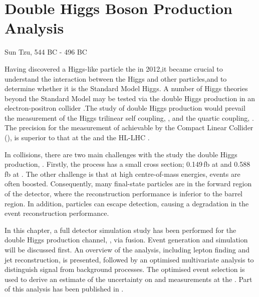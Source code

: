 \chapter{Double Higgs Boson Production Analysis}
\label{chap:DoubleHiggs}

%
{Sun Tzu, 544 BC - 496 BC}%


Having discovered a Higgs-like particle the \LHC in 2012\cite{Aad:2012tfa,Chatrchyan:2012ufa},it became  crucial to understand the interaction between the Higgs and other particles,and  to determine whether it is the Standard Model Higgs. A number of Higgs theories beyond the Standard Model may be tested via the double Higgs production in an electron-positron collider \cite{Kaplan:1983fs,Goldberger:2008zz}.The study of double Higgs production would prevail the  measurement of the Higgs trilinear self coupling, \gHHH, and the quartic coupling, \gWWHH. The precision for the measurement of \gHHH achievable by the Compact Linear Collider (\CLIC), is superior to that at the \LHC and the HL-LHC  \cite{Contino:2013gna}.


In \ee collisions, there are two main challenges with the study the double Higgs production,  \eeToHH. Firstly, the process has a small cross section; 0.149\,fb at  and 0.588\,fb at . The other challenge is that at high centre-of-mass energies, events are often boosted.  Consequently, many final-state particles are in the forward region of the detector, where the reconstruction performance is inferior to the barrel region. In addition, particles can escape detection, causing a degradation in the event reconstruction performance.


In this chapter, a full \CLICILD detector simulation study has been performed for the double Higgs production channel, \eeToHH, via \WW fusion. Event generation and simulation will be discussed first. An overview of the analysis, including lepton finding and jet reconstruction, is presented, followed by an optimised multivariate analysis to distinguish signal from background processes. The optimised event selection is used to derive an estimate of the uncertainty on  \gHHH and \gWWHH measurements at the \CLIC. Part  of this analysis has been published in \cite{Abramowicz:2016zbo}.

